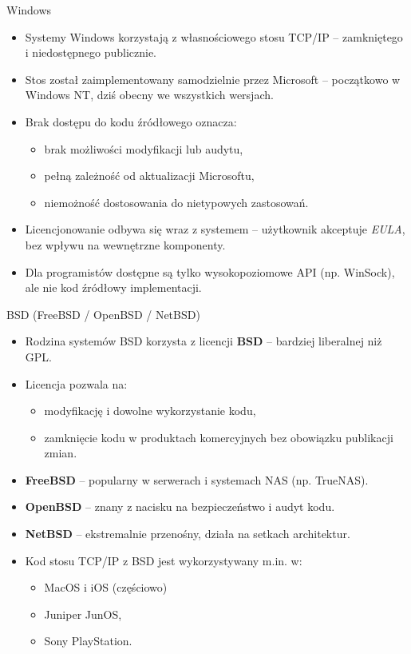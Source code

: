 \documentclass[aspectratio=169]{beamer}
\begin{document}
\begin{frame}{Windows}
  \begin{itemize}
    \item Systemy Windows korzystają z własnościowego stosu TCP/IP – zamkniętego i niedostępnego publicznie.
    \item Stos został zaimplementowany samodzielnie przez Microsoft – początkowo w Windows NT, dziś obecny we wszystkich wersjach.
    \item Brak dostępu do kodu źródłowego oznacza:
    \begin{itemize}
      \item brak możliwości modyfikacji lub audytu,
      \item pełną zależność od aktualizacji Microsoftu,
      \item niemożność dostosowania do nietypowych zastosowań.
    \end{itemize}
    \item Licencjonowanie odbywa się wraz z systemem – użytkownik akceptuje \textit{EULA}, bez wpływu na wewnętrzne komponenty.
    \item Dla programistów dostępne są tylko wysokopoziomowe API (np. WinSock), ale nie kod źródłowy implementacji.
  \end{itemize}
\end{frame}

\begin{frame}{BSD (FreeBSD / OpenBSD / NetBSD)}
  \begin{itemize}
    \item Rodzina systemów BSD korzysta z licencji \textbf{BSD} – bardziej liberalnej niż GPL.
    \item Licencja pozwala na:
    \begin{itemize}
      \item modyfikację i dowolne wykorzystanie kodu,
      \item zamknięcie kodu w produktach komercyjnych bez obowiązku publikacji zmian.
    \end{itemize}
    \item \textbf{FreeBSD} – popularny w serwerach i systemach NAS (np. TrueNAS).
    \item \textbf{OpenBSD} – znany z nacisku na bezpieczeństwo i audyt kodu.
    \item \textbf{NetBSD} – ekstremalnie przenośny, działa na setkach architektur.
    \item Kod stosu TCP/IP z BSD jest wykorzystywany m.in. w:
    \begin{itemize}
      \item MacOS i iOS (częściowo)
      \item Juniper JunOS,
      \item Sony PlayStation.
    \end{itemize}
  \end{itemize}
\end{frame}
\end{document}
